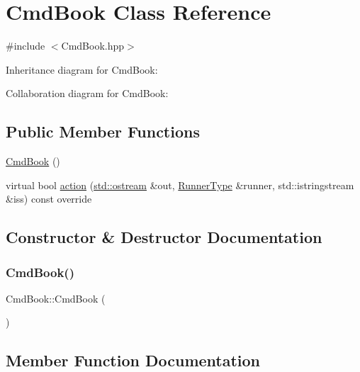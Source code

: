 \hypertarget{classCmdBook}{}\section{Cmd\+Book Class Reference}
\label{classCmdBook}


{\ttfamily \#include $<$Cmd\+Book.\+hpp$>$}



Inheritance diagram for Cmd\+Book\+:


Collaboration diagram for Cmd\+Book\+:
\subsection*{Public Member Functions}
\begin{DoxyCompactItemize}
\item 
\hyperlink{classCmdBook_a1f6b2ca988342969602ed97012c15431}{Cmd\+Book} ()
\item 
virtual bool \hyperlink{classCmdBook_ad3d3448c7cc058a1ca346d85e40abc66}{action} (\hyperlink{doctest_8h_a116af65cb5e924b33ad9d9ecd7a783f3}{std\+::ostream} \&out, \hyperlink{Command_8hpp_ad45c3de597c2023a8be0399d914161f4}{Runner\+Type} \&runner, std\+::istringstream \&iss) const override
\end{DoxyCompactItemize}


\subsection{Constructor \& Destructor Documentation}
\mbox{\label{classCmdBook_a1f6b2ca988342969602ed97012c15431}} 
\subsubsection{\texorpdfstring{Cmd\+Book()}{CmdBook()}}
{\footnotesize\ttfamily Cmd\+Book\+::\+Cmd\+Book (\begin{DoxyParamCaption}{ }\end{DoxyParamCaption})}



\subsection{Member Function Documentation}
\mbox{\label{classCmdBook_ad3d3448c7cc058a1ca346d85e40abc66}} 
